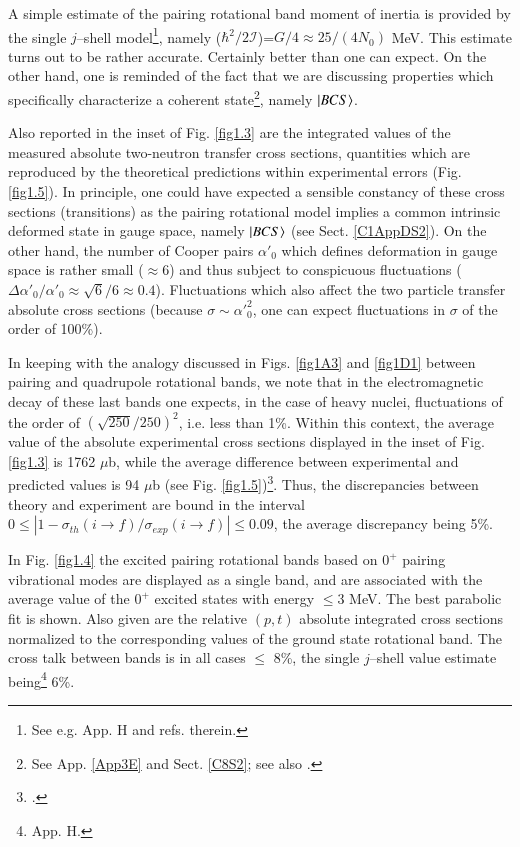   A simple estimate of the pairing rotational band moment of inertia is provided by the single $j$--shell model\footnote{See e.g. \cite{Brink:05} App. H and refs. therein.}, namely ($\hbar^2/2\mathcal I$)=$G/4\approx25/(4N_0)$ MeV. This estimate turns out to be rather accurate. Certainly better than one can expect. On the other hand, one is reminded of the fact that we are discussing properties which specifically characterize a coherent state\footnote{See App. \ref{App3E} and Sect. \ref{C8S2}; see also \cite{Potel:17}.}, namely $|{BCS} \rangle$.
  
  

  Also reported in the inset of Fig. \ref{fig1.3} are the integrated values of the measured absolute two-neutron transfer cross sections, quantities which are reproduced by the theoretical predictions within experimental errors (Fig. \ref{fig1.5}). In principle, one could have expected a sensible constancy of these cross sections (transitions) as the pairing rotational model implies a common intrinsic deformed state in gauge space, namely $|{BCS} \rangle$ (see Sect. \ref{C1AppDS2}). On the other hand, the number of Cooper pairs $\alpha'_0$ which defines deformation in gauge space is rather small ($\approx6$) and thus subject to conspicuous fluctuations  ($\Delta\alpha'_0/\alpha'_0\approx\sqrt{6}/6\approx 0.4$).  Fluctuations which also affect the  two particle transfer absolute cross sections (because $\sigma\sim\alpha'^{2}_0$, one can expect fluctuations in $\sigma$ of the order of 100\%).  
  
  In keeping with the analogy discussed in Figs. \ref{fig1A3} and \ref{fig1D1} between pairing and quadrupole rotational bands, we note that in the electromagnetic decay of these last bands one expects, in the case of heavy nuclei, fluctuations of the order of $(\sqrt{250}/250)^2$, i.e. less than 1\%. Within this context, the average value of the absolute experimental cross sections displayed in the inset of Fig. \ref{fig1.3} is 1762 $\mu$b, while the average difference between experimental and predicted values is 94 $\mu$b (see Fig. \ref{fig1.5})\footnote{\cite{Potel:13b}.}. Thus, the discrepancies between theory and experiment are bound in the interval $0\leq|1-\sigma_{th}(i\to f)/\sigma_{exp}(i\to f)|\leq 0.09$, the average discrepancy being 5\%.
  
  
  In Fig. \ref{fig1.4} the excited pairing rotational bands based on $0^+$ pairing vibrational modes are displayed as a single band, and are associated with the average  value of the $0^+$ excited states with energy $\leq$3 MeV. The best parabolic fit is shown. Also given are the relative $(p,t)$ absolute integrated cross sections normalized to the corresponding values of the ground state rotational band. The cross talk between bands is in all cases $\leq$ 8\%, the single $j$--shell value estimate being\footnote{\cite{Brink:05} App. H.} 6\%.
  
